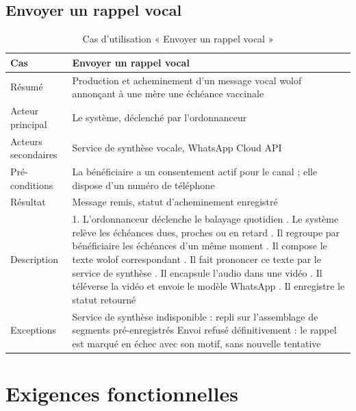 \documentclass[11pt,a4paper]{report}
\begin{document}
\subsection{Envoyer un rappel vocal}

\begin{table}[H]
\centering
\begin{tabularx}{\textwidth}{@{}lX@{}}
\toprule
\textbf{Cas} & Envoyer un rappel vocal \\
\midrule
Résumé & Production et acheminement d'un message vocal wolof annonçant à une
mère une échéance vaccinale \\
Acteur principal & Le système, déclenché par l'ordonnanceur \\
Acteurs secondaires & Service de synthèse vocale, WhatsApp Cloud API \\
Pré-conditions & La bénéficiaire a un consentement actif pour le canal ;
elle dispose d'un numéro de téléphone \\
Résultat & Message remis, statut d'acheminement enregistré \\
\addlinespace
Description &
1. L'ordonnanceur déclenche le balayage quotidien \newline
2. Le système relève les échéances dues, proches ou en retard \newline
3. Il regroupe par bénéficiaire les échéances d'un même moment \newline
4. Il compose le texte wolof correspondant \newline
5. Il fait prononcer ce texte par le service de synthèse \newline
6. Il encapsule l'audio dans une vidéo \newline
7. Il téléverse la vidéo et envoie le modèle WhatsApp \newline
8. Il enregistre le statut retourné \\
\addlinespace
Exceptions &
Service de synthèse indisponible : repli sur l'assemblage de segments
pré-enregistrés \newline
Envoi refusé définitivement : le rappel est marqué en échec avec son motif,
sans nouvelle tentative \\
\bottomrule
\end{tabularx}
\caption{Cas d'utilisation « Envoyer un rappel vocal »}
\end{table}

\section{Exigences fonctionnelles}
\end{document}

